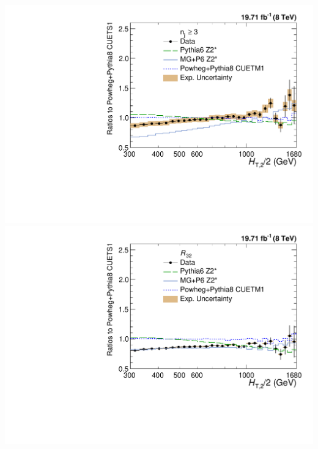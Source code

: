 \documentclass{beamer}
\begin{document}
\begin{frame}
\includegraphics[scale = 0.215]{Plots_HT_2_150/Comparison_data_MC_samples_3_Pow.pdf}%
\includegraphics[scale = 0.215]{Plots_HT_2_150/Comparison_data_MC_samples_ratio_32_Pow.pdf}
\end{frame}

\begin{frame}
\begin{center}
\vspace{13mm}
\textbf{\Large{}}
\end{center}
\end{frame}
\end{document}
